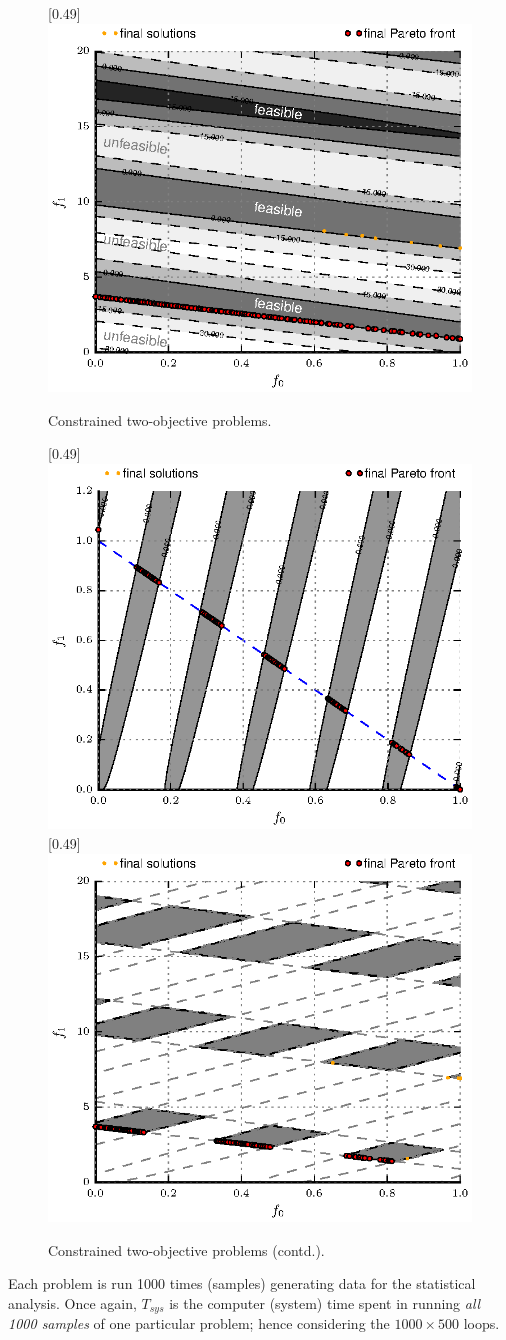 \documentclass[final,5p,times,twocolumn]{elsarticle}
\begin{document}
\begin{figure}
[0.49\linewidth]{\includegraphics[width=0.42\linewidth]{./figs/res/CTP6.eps}}
\caption{Constrained two-objective problems.}%
\label{fig:ct-two-objA}
\end{figure}

\begin{figure} \centering
{}[0.49\linewidth]{\includegraphics[width=0.42\linewidth]{./figs/res/CTP7.eps}}
[0.49\linewidth]{\includegraphics[width=0.42\linewidth]{./figs/res/CTP8.eps}}
\caption{Constrained two-objective problems (contd.).}%
\label{fig:ct-two-objB}
\end{figure}

Each problem is run 1000 times (samples) generating data for the statistical analysis. Once again,
$T_{sys}$ is the computer (system) time spent in running \emph{all 1000 samples} of one particular
problem; hence considering the $1000 \times 500$ loops.
\end{document}
